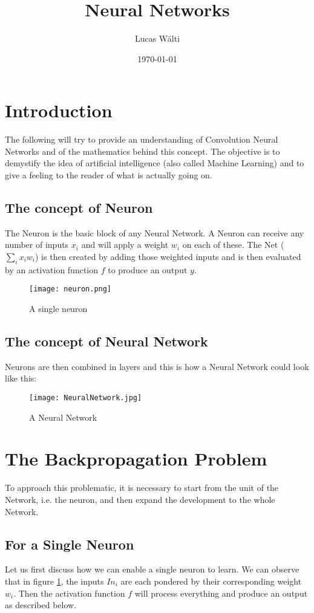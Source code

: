 \documentclass[10pt,a4paper]{article}
\title{Neural Networks}
\author{Lucas Wälti}
\date{\today}
\begin{document}
\maketitle
\thispagestyle{empty}	%

\newpage
\section{Introduction}
The following will try to provide an understanding of Convolution Neural Networks and of the mathematics behind this concept. The objective is to demystify the idea of artificial intelligence (also called Machine Learning) and to give a feeling to the reader of what is actually going on. 
\subsection{The concept of Neuron}
The Neuron is the basic block of any Neural Network. A Neuron can receive any number of inputs $x_i$ and will apply a weight $w_i$ on each of these. The Net ($\sum_{i}{x_iw_i}$) is then created by adding those weighted inputs and is then evaluated by an activation function $f$ to produce an output $y$. 

\begin{figure}[h] %
\centering
\texttt{[image: neuron.png]}
\caption{A single neuron}
\label{n}
\end{figure}

\subsection{The concept of Neural Network}
Neurons are then combined in layers and this is how a Neural Network could look like this: 

\begin{figure}[h] %
\centering
\texttt{[image: NeuralNetwork.jpg]}
\caption{A Neural Network}
\label{nn}
\end{figure}

\newpage
\section{The Backpropagation Problem}
To approach this problematic, it is necessary to start from the unit of the Network, i.e. the neuron, and then expand the development to the whole Network. 
\subsection{For a Single Neuron}
Let us first discuss how we can enable a single neuron to learn. We can observe that in figure \ref{n}, the inputs $In_i$ are each pondered by their corresponding weight $w_i$. Then the activation function $f$ will process everything and produce an output as described below. 
\end{document}
